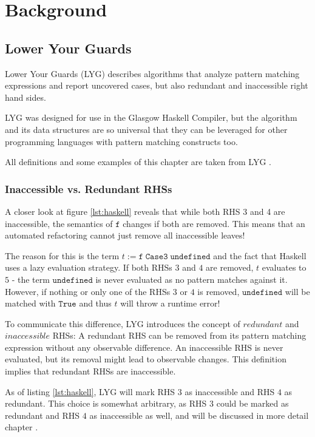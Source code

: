 \chapter{Background}\label{sec:background}

\section{Lower Your Guards}

Lower Your Guards (LYG) \cite{10.1145/3408989} describes algorithms that analyze pattern matching expressions and report uncovered cases, but also redundant and inaccessible right hand sides.

LYG was designed for use in the Glasgow Haskell Compiler,
but the algorithm and its data structures are so universal
that they can be leveraged for other programming languages with pattern matching constructs too.

All definitions and some examples of this chapter are taken from LYG \cite{10.1145/3408989}.

\subsection{Inaccessible vs. Redundant RHSs}

A closer look at figure \ref{lst:haskell} reveals that while both RHS 3 and 4 are inaccessible,
the semantics of $\mathtt{f}$ changes if both are removed.
This means that an automated refactoring cannot just remove all inaccessible leaves!

The reason for this is the term $t := \mathtt{f}\;\mathtt{Case3}\;\mathtt{undefined}$ and the fact that Haskell uses a lazy evaluation strategy.
If both RHSs $3$ and $4$ are removed, $t$ evaluates to $5$ - the term $\mathtt{undefined}$ is never evaluated as no pattern matches against it.
However, if nothing or only one of the RHSs $3$ or $4$ is removed, $\mathtt{undefined}$ will be matched with $\mathtt{True}$ and thus $t$ will throw a runtime error!

To communicate this difference, LYG introduces the concept of $\mathit{redundant}$ and $\mathit{inaccessible}$ RHSs:
A redundant RHS can be removed from its pattern matching expression without any observable difference.
An inaccessible RHS is never evaluated, but its removal might lead to observable changes.
This definition implies that redundant RHSs are inaccessible.

As of listing \ref{lst:haskell}, LYG will mark RHS $3$ as inaccessible and RHS $4$ as redundant.
This choice is somewhat arbitrary, as RHS $3$ could be marked as redundant and RHS $4$ as inaccessible as well, and will be discussed in more detail chapter .

